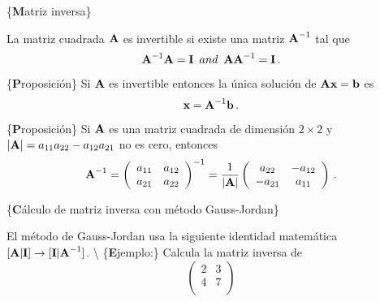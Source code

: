 \documentclass[
]{agujournal2019}
\begin{document}
\{\noindent \textbf Matriz inversa\}

\noindent La matriz cuadrada \({\textbf A}\) es invertible si existe una
matriz \({\textbf A}^{-1}\) tal que
\[{\textbf A}^{-1}{\textbf A}={\textbf I}\,\,\,{ and}\,\,\,{\textbf A}{\textbf A}^{-1}={\textbf I}\,.\]

\vspace{0.5cm}

\{\noindent \textbf Proposición\} Si \({\textbf A}\) es invertible
entonces la única solución de \({\textbf A}{\textbf x}={\textbf b}\) es
\[{\textbf x}={\textbf A}^{-1}{\textbf b}\,.\]

\vspace{0.5cm}

\{\noindent \textbf Proposición\} Si \({\textbf A}\) es una matriz
cuadrada de dimensión \(2\times 2\) y
\(|{\textbf A}|=a_{11}a_{22} - a_{12}a_{21}\) no es cero, entonces
\[{\textbf A}^{-1}=\left(\begin{array}{cc}
  a_{11} & a_{12} \\
  a_{21} & a_{22} \\
\end{array}
  \right)^{-1} =
  \frac{1}{|{\textbf A}|}
  \left(\begin{array}{cc}
  a_{22} & -a_{12} \\
  -a_{21} & a_{11} \\
\end{array}
  \right)
\,.\]

\vspace{0.5cm}

\{\noindent \textbf Cálculo de matriz inversa con método Gauss-Jordan\}

\noindent El método de Gauss-Jordan usa la siguiente identidad
matemática
\([{\textbf A}|{\textbf I}]\rightarrow [{\textbf I}|{\textbf A}^{-1}]\).
\textbackslash{} \{\textbf Ejemplo:\} Calcula la matriz inversa de
\[\left(\begin{array}{cc}
  2 & 3 \\
  4 & 7 \\
\end{array}
  \right)\]
\end{document}
